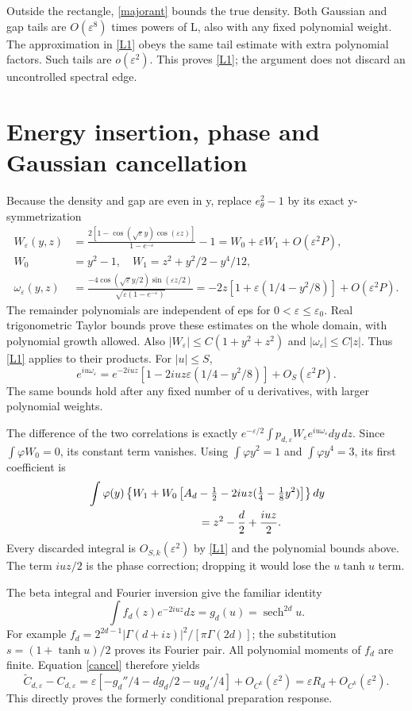 \documentclass[11pt]{article}
\newcommand{\eps}{\varepsilon}
\newcommand{\sech}{\operatorname{sech}}
\begin{document}
Outside the rectangle, \eqref{majorant} bounds the true density.
Both Gaussian and gap tails are $O(\eps^8)$ times powers of L,
also with any fixed polynomial weight. The approximation in
\eqref{L1} obeys the same tail estimate with extra polynomial
factors. Such tails are $o(\eps^2)$. This proves \eqref{L1};
the argument does not discard an uncontrolled spectral edge.

\newpage
\section{Energy insertion, phase and Gaussian cancellation}
Because the density and gap are even in y, replace $e_\theta^2-1$
by its exact y-symmetrization
\begin{align}
 W_\eps(y,z)&=\frac{2[1-\cos(\sqrt\eps y)\cos(\eps z)]}{1-e^{-\eps}}-1
       =W_0+\eps W_1+O(\eps^2P),\nonumber\\
 W_0&=y^2-1,\quad W_1=z^2+y^2/2-y^4/12,\label{weight}\\
 \omega_\eps(y,z)&=
 \frac{-4\cos(\sqrt\eps y/2)\sin(\eps z/2)}
 {\sqrt{\eps(1-e^{-\eps})}}
 =-2z[1+\eps(1/4-y^2/8)]+O(\eps^2P).\label{phase}
\end{align}
The remainder polynomials are independent of eps for $0<\eps\le\eps_0$.
Real trigonometric Taylor bounds prove these estimates on the
whole domain, with polynomial growth allowed. Also
$|W_\eps|\le C(1+y^2+z^2)$ and $|\omega_\eps|\le C|z|$.
Thus \eqref{L1} applies to their products. For $|u|\le S$,
\[
 e^{iu\omega_\eps}=e^{-2iuz}
 [1-2iuz\eps(1/4-y^2/8)]+O_S(\eps^2P).
\]
The same bounds hold after any fixed number of u derivatives,
with larger polynomial weights.

The difference of the two correlations is exactly
$e^{-\eps/2}\int p_{d,\eps}W_\eps e^{iu\omega_\eps}dy\,dz$.
Since $\int\varphi W_0=0$, its constant term vanishes. Using
$\int\varphi y^2=1$ and $\int\varphi y^4=3$, its first coefficient is
\begin{align}
 &\int\varphi(y)\left\{W_1+W_0\left[
 A_d-\tfrac12-2iuz(\tfrac14-\tfrac18y^2)\right]\right\}dy
 \nonumber\\
 &\hspace{35mm}=z^2-\frac d2+\frac{iuz}{2}.\label{cancel}
\end{align}
Every discarded integral is $O_{S,k}(\eps^2)$ by \eqref{L1}
and the polynomial bounds above. The term $iuz/2$ is the
phase correction; dropping it would lose the $u\tanh u$ term.

The beta integral and Fourier inversion give the familiar identity
\begin{equation}\label{Fourier}
 \int f_d(z)e^{-2iuz}dz=g_d(u)=\sech^{2d}u.
\end{equation}
For example $f_d=2^{2d-1}|\Gamma(d+iz)|^2/[\pi\Gamma(2d)]$;
the substitution $s=(1+\tanh u)/2$ proves its Fourier pair.
All polynomial moments of $f_d$ are finite. Equation \eqref{cancel}
therefore yields
\[
 \widetilde C_{d,\eps}-C_{d,\eps}
 =\eps[-g_d''/4-dg_d/2-ug_d'/4]+O_{C^k}(\eps^2)
 =\eps R_d+O_{C^k}(\eps^2).
\]
This directly proves the formerly conditional preparation response.
\end{document}
